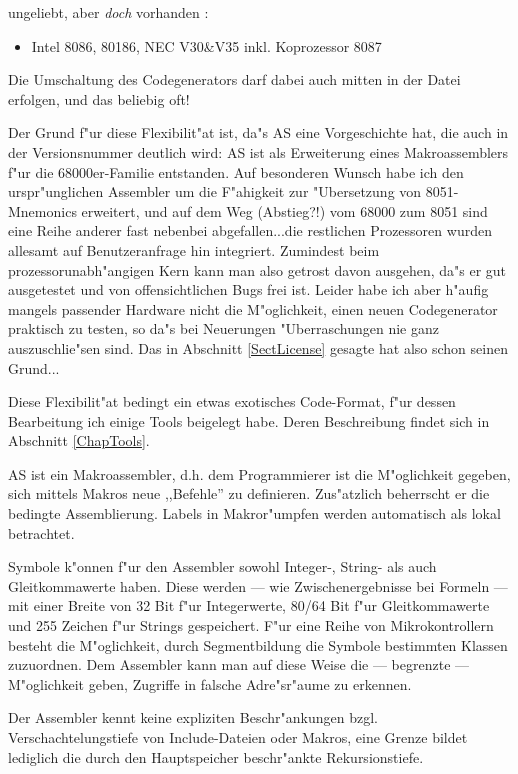 \documentclass[12pt,a4paper,twoside]{report}
\begin{document}
ungeliebt, aber {\it doch} vorhanden :
\begin{itemize}
\item{Intel 8086, 80186, NEC V30\&V35 inkl. Koprozessor 8087}
\end{itemize}
Die Umschaltung des Codegenerators darf dabei auch mitten in der Datei
erfolgen, und das beliebig oft!
\par
Der Grund f"ur diese Flexibilit"at ist, da"s AS eine Vorgeschichte hat,
die auch in der Versionsnummer deutlich wird: AS ist als Erweiterung eines
Makroassemblers f"ur die 68000er-Familie entstanden.  Auf besonderen
Wunsch habe ich den urspr"unglichen Assembler um die F"ahigkeit zur
"Ubersetzung von 8051-Mnemonics erweitert, und auf dem Weg (Abstieg?!) vom
68000 zum 8051 sind eine Reihe anderer fast nebenbei abgefallen...die
restlichen Prozessoren wurden allesamt auf Benutzeranfrage hin integriert.
Zumindest beim prozessorunabh"angigen Kern kann man also getrost davon
ausgehen, da"s er gut ausgetestet und von offensichtlichen Bugs frei ist.
Leider habe ich aber h"aufig mangels passender Hardware nicht die
M"oglichkeit, einen neuen Codegenerator praktisch zu testen, so da"s bei
Neuerungen "Uberraschungen nie ganz auszuschlie"sen sind.  Das in
Abschnitt \ref{SectLicense} gesagte hat also schon seinen Grund...
\par
Diese Flexibilit"at bedingt ein etwas exotisches Code-Format, f"ur dessen
Bearbeitung ich einige Tools beigelegt habe.  Deren Beschreibung findet
sich in Abschnitt \ref{ChapTools}.
\par
AS ist ein Makroassembler, d.h. dem Programmierer ist die M"oglichkeit
gegeben, sich mittels Makros neue ,,Befehle'' zu definieren.  Zus"atzlich
beherrscht er die bedingte Assemblierung.  Labels in Makror"umpfen werden
automatisch als lokal betrachtet.
\par
Symbole k"onnen f"ur den Assembler sowohl Integer-, String- als auch
Gleitkommawerte haben.  Diese werden --- wie Zwischenergebnisse bei Formeln
--- mit einer Breite von 32 Bit f"ur Integerwerte, 80/64 Bit f"ur
Gleitkommawerte und 255 Zeichen f"ur Strings gespeichert.  F"ur eine Reihe
von Mikrokontrollern besteht die M"oglichkeit, durch Segmentbildung die
Symbole bestimmten Klassen zuzuordnen.  Dem Assembler kann man auf diese
Weise die --- begrenzte --- M"oglichkeit geben, Zugriffe in falsche
Adre"sr"aume zu erkennen.
\par
Der Assembler kennt keine expliziten Beschr"ankungen bzgl.
Verschachtelungstiefe von Include-Dateien oder Makros, eine Grenze bildet
lediglich die durch den Hauptspeicher beschr"ankte Rekursionstiefe.
\end{document}
